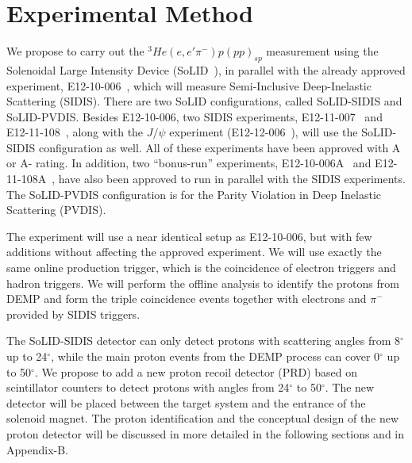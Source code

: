 \section{Experimental Method}

We propose to carry out the $^3He(e,e'\pi^-)p(pp)_{sp}$ measurement using the
Solenoidal Large Intensity Device (SoLID~\cite{solid_pcdr}), in parallel with
the already approved experiment, E12-10-006~\cite{solid:e12-10-006}, which will
measure Semi-Inclusive Deep-Inelastic Scattering (SIDIS). There are two SoLID
configurations, called SoLID-SIDIS and SoLID-PVDIS. Besides E12-10-006, two
SIDIS experiments, E12-11-007~\cite{solid:e12-11-007} and
E12-11-108~\cite{solid:e12-11-108}, along with the $J/\psi$ experiment
(E12-12-006~\cite{solid:e12-12-006}), will use the SoLID-SIDIS
configuration as well. All of these experiments have been approved with A or A-
rating. In addition, two ``bonus-run'' experiments,
E12-10-006A~\cite{solid:e12-10-006A} and E12-11-108A~\cite{solid:e12-11-008A},
have also been approved to run in parallel with the SIDIS experiments. The
SoLID-PVDIS configuration is for the Parity Violation in Deep Inelastic
Scattering (PVDIS).

The experiment will use a near identical setup as E12-10-006, but with few
additions without affecting the approved experiment. We will use exactly the
same online production trigger, which is the coincidence of electron triggers
and hadron triggers. We will perform the offline analysis to identify the protons from DEMP and form the triple
coincidence events together with electrons and $\pi^{-}$ provided by SIDIS triggers. 

The SoLID-SIDIS detector can only detect protons with
scattering angles from 8$^{\circ}$ up to 24$^{\circ}$, while the main proton
events from the DEMP process can cover 0$^{\circ}$  up to 50$^{\circ}$. We propose to add a
new proton recoil detector (PRD) based on scintillator counters to detect protons with angles from
24$^{\circ}$ to 50$^{\circ}$. The new detector will be placed between the
target system and the entrance of the solenoid magnet. The proton identification
and the conceptual design of the new proton detector will be discussed in more detailed in the following
sections and in Appendix-B.

